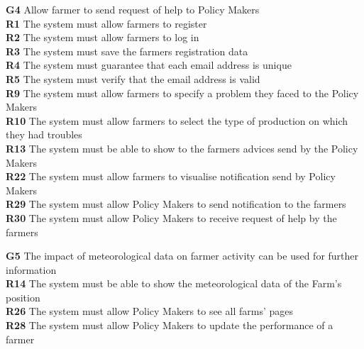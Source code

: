 \textbf{G4} Allow farmer to send request of help to Policy Makers\\
    \textbf{R1} The system must allow farmers to register\\
    \textbf{R2} The system must allow farmers to log in\\
    \textbf{R3} The system must save the farmers registration data\\
    \textbf{R4} The system must guarantee that each email address is unique\\
    \textbf{R5} The system must verify that the email address is valid\\
    \textbf{R9} The system must allow farmers to specify a problem they faced to the Policy Makers\\
    \textbf{R10} The system must allow farmers to select the type of production on which they had troubles\\
    \textbf{R13} The system must be able to show to the farmers advices send by the Policy Makers\\
    \textbf{R22} The system must allow farmers to visualise notification send by Policy Makers\\
    \textbf{R29} The system must allow Policy Makers to send notification to the farmers\\
    \textbf{R30} The system must allow Policy Makers to receive request of help by the farmers\\
    \textbf{}
    \textbf{}
    \textbf{}
    \textbf{}
    \textbf{}
    
\textbf{G5} The impact of meteorological data on farmer activity can be used for further information\\
    \textbf{R14} The system must be able to show the meteorological data of the Farm’s position\\
    \textbf{R26} The system must allow Policy Makers to see all farms’ pages\\
    \textbf{R28} The system must allow Policy Makers to update the performance of a farmer\\
    \textbf{}
    \textbf{}
    \textbf{}
    \textbf{}
    \textbf{}
    \textbf{}
    \textbf{}
    \textbf{}
    
